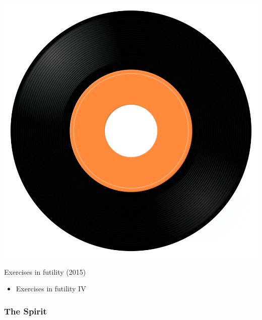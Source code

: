 \begin{minipage}[t]{0.25\textwidth}
\captionsetup{type=figure}
\includegraphics[width=\textwidth]{Images/cover.png}
\caption*{Exercises in futility (2015)}
\end{minipage}
\begin{minipage}[t]{0.25\textwidth}\vspace{0pt}
\begin{itemize}[nosep,leftmargin=1em,labelwidth=*,align=left]
	\setlength{\itemsep}{0pt}
	\item Exercises in futility IV
\end{itemize}
\end{minipage}

\subsubsection{The Spirit}


